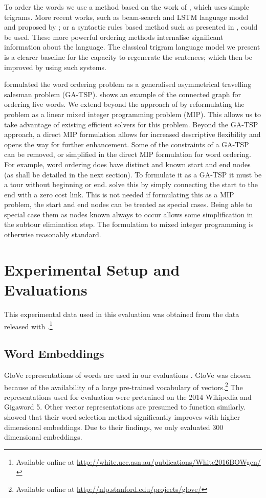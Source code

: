 \documentclass[compsoc]{IEEEtran}
\theoremstyle{plain}
\theoremstyle{definition}
\begin{document}
To order the words we use a method based on the work of \textcite{Horvat2014}, which uses simple trigrams. More recent works, such as beam-search and LSTM language model and proposed by \textcite{2016arXiv160408633S}; or a syntactic rules based method such as presented in \textcite{ZhangWordOrderSyntax}, could be used. These more powerful ordering methods internalise significant information about the language. The classical trigram language model we present is a clearer baseline for the capacity to regenerate the sentences; which then be improved by using such systems.

\textcite{Horvat2014} formulated the word ordering problem as a generalised asymmetrical travelling salesman problem (GA-TSP).  shows an example of the connected graph for ordering five words. We extend beyond the approach of \textcite{Horvat2014} by reformulating the problem as a linear mixed integer programming problem (MIP). This allows us to take advantage of existing efficient solvers for this problem. 
Beyond the GA-TSP approach, a direct MIP formulation allows for increased descriptive flexibility and opens the way for further enhancement. Some of the constraints of a GA-TSP can be removed, or simplified in the direct MIP formulation for word ordering.  For example, word ordering does have distinct and known start and end nodes (as shall be detailed in the next section). To formulate it as a GA-TSP it must be a tour without beginning or end. \textcite{Horvat2014} solve this by simply connecting the start to the end with a zero cost link. This is not needed if formulating this as a MIP problem, the start and end nodes can be treated as special cases. Being able to special case them as nodes known always to occur allows some simplification in the subtour elimination step. The formulation to mixed integer programming is otherwise reasonably standard.




\section{Experimental Setup and Evaluations} \label{evalsettings}
This experimental data used in this evaluation was
obtained from the data released with \textcite{White2015BOWgen}.\footnote{Available online at \url{http://white.ucc.asn.au/publications/White2016BOWgen/}}
\subsection{Word Embeddings}
GloVe representations of words are used in our evaluations \parencite{pennington2014glove}. GloVe was chosen because of the availability of a large pre-trained vocabulary of vectors.\footnote{Available online at \url{http://nlp.stanford.edu/projects/glove/}} The representations used for evaluation were pretrained on the 2014 Wikipedia and Gigaword 5.  Other vector representations are presumed to function similarly.
\textcite{White2015BOWgen} showed that their word selection method significantly improves with higher dimensional embeddings. Due to their findings, we only evaluated 300 dimensional embeddings.
\end{document}
